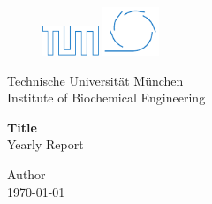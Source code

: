 \begin{figure}[H]
	\begin{center}
		\includegraphics[width=0.15\textwidth]{images/title/logo-TUM-empty}
    \hspace{.65\textwidth}
    \includegraphics[width=0.15\textwidth]{images/title/logo-MW}
	\end{center}
\end{figure}

\vspace{1cm}

\begin{center}
	{\Huge Technische Universit\"at M\"unchen}
	\\[5mm]
	{\Large Institute of Biochemical Engineering}
\end{center}

\vspace{15mm}

\begin{center}
    \begin{minipage}[c]{.7\textwidth}
        \centering
        \doublespacing
        {
            \textbf{\LARGE Title}
        }
        \\[1cm]
        {
            \Large
            Yearly Report \the\year
        }
    \end{minipage}
\end{center}

\vspace{\fill}

\begin{center}
    {\Large Author}
    \\[0.5cm]
    \today %
\end{center}
  
\clearpage\mbox{}\clearpage

%

